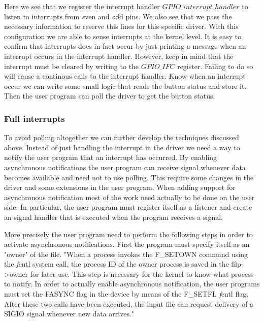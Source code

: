 Here we see that we register the interrupt handler $GPIO\_interrupt\_handler$ to listen to interrupts from {\emph even} and {\emph odd} pins. We also see that we pass the necessary information to reserve this lines for this specific driver. With this configuration we are able to sense interrupts at the kernel level. It is easy to confirm that interrupts does in fact occur by just printing a message when an interrupt occurs in the interrupt handler. However, keep in mind that the interrupt must be cleared by writing to the $GPIO\_IFC$ register. Failing to do so will cause a continous calls to the interrupt handler. Know when an interrupt occur we can write some small logic that reads the button status and store it. Then the user program can poll the driver to get the button status. 


\subsubsection{Full interrupts}
To avoid polling altogether we can further develop the techniques discussed above. Instead of just handling the interrupt in the driver we need a way to notify the user program that an interrupt has occurred. By enabling asynchronous notifications the user program can receive signal whenever data becomes available and need not to use polling. This require some changes in the driver and some extensions in the user program. When adding support for asynchronous notification most of the work need actually to be done on the user side. In particular, the user program must register itself as a listener and create an signal handler that is executed when the program receives a signal. 

More precisely the user program need to perform the following steps in order to activate asynchronous notifications. First the program must specify itself as an "owner" of the file. "When a process invokes the F\_SETOWN command using the {\emph fcntl} system call, the process ID of the owner process is saved in the filp->owner for later use. This step is necessary for the kernel to know what process to notify. In order to actually enable asynchronous notification, the user programs must set the FASYNC flag in the device by means of the F\_SETFL {\emph fcntl} flag. After these two calls have been executed, the input file can request delivery of a SIGIO signal whenever new data arrives."

